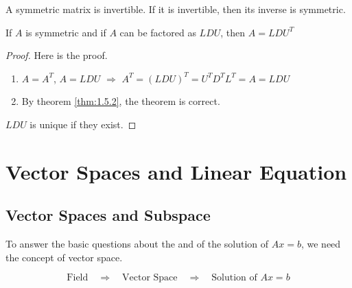\begin{note}
    A symmetric matrix is  invertible. If it is invertible, then its inverse is symmetric.
\end{note}

\begin{theorem}
    If $A$ is symmetric and if $A$ can be factored as $LDU$, then $A=LDU^T$
\end{theorem}
\begin{proof}
    Here is the proof.
    \begin{enumerate}[label=$\arabic*^\circ$]
        \item $A=A^T$, $A=LDU$ $\Rightarrow$ $A^T = (LDU)^T = U^TD^TL^T = A = LDU$
        \item By theorem \ref{thm:1.5.2}, the theorem is correct.
    \end{enumerate}
    
    $LDU$ is unique if they exist.
\end{proof}

\chapter{Vector Spaces and Linear Equation}

\section{Vector Spaces and Subspace}

To answer the basic questions about the  and  of the solution of $Ax=b$, we need the concept of vector space.

\[
\text{Field} \quad \Longrightarrow \quad \text{Vector Space} \quad \Longrightarrow \quad \text{Solution of } Ax=b
\]

